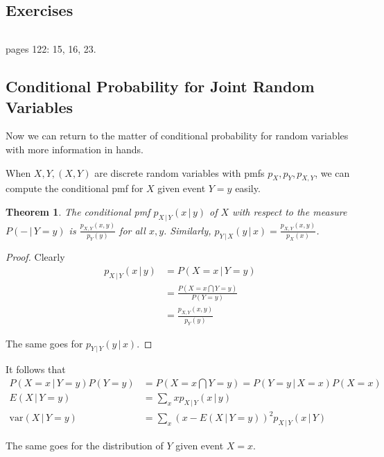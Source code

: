 \documentclass[12pt]{amsart}
\newtheorem{theorem}{Theorem}[section]
\theoremstyle{definition}
\begin{document}
\subsection{Exercises} $ $

pages 122: 15, 16, 23.

\subsection{Conditional Probability for Joint Random Variables} Now we can return to the matter of conditional probability for random variables with more information in hands.

When $X, Y, (X, Y)$ are discrete random variables with pmfs $p_X, p_Y, p_{X, Y}$, we can compute the conditional pmf for $X$ given event $Y = y$ easily.
\begin{theorem} \label{conditional_pmf_for_joint_discrete_XY} The conditional pmf $p_{X \,|\, Y}(x \,|\, y)$ of $X$ with respect to the measure $P( - \,|\, Y = y)$ is $\frac{p_{X, Y}(x, y)}{p_Y(y)}$ for all $x, y$. Similarly, $p_{Y \,|\, X}(y \,|\, x) = \frac{p_{X, Y}(x, y)}{p_X(x)}$.
\end{theorem}
\begin{proof} Clearly
\begin{align*}
p_{X \,|\, Y}(x \,|\, y) & = P(X = x \,|\, Y= y) \\
 & = \frac{P(X = x \bigcap Y = y)}{P(Y = y)} \\
 & = \frac{p_{X, Y}(x, y)}{p_Y(y)}
\end{align*}

The same goes for $p_{Y \,|\, Y}(y \,|\, x)$.
\end{proof}

It follows that
\begin{align*}
P(X = x \,|\, Y= y)P(Y = y) & = P(X = x \bigcap Y = y) = P(Y = y \,|\, X = x)P(X = x) \\
E(X \,|\, Y = y) & = \sum\limits_x xp_{X \,|\, Y}(x \,|\, y) \\
\text{var}(X \,|\, Y = y) & = \sum\limits_x (x - E(X \,|\, Y = y))^2 p_{X\,|\, Y}(x \,|\, Y)
\end{align*}

The same goes for the distribution of $Y$ given event $X = x$.
\end{document}
